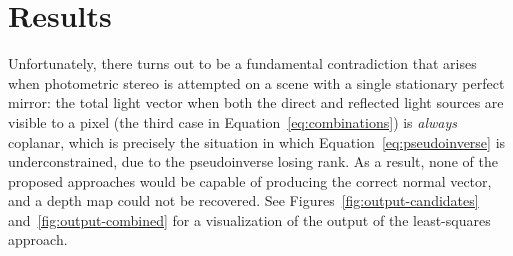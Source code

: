 \section{Results}\label{sec:results}
Unfortunately, there turns out to be a fundamental contradiction that arises
when photometric stereo is attempted on a scene with a single stationary
perfect mirror: the total light vector when both the direct and reflected light
sources are visible to a pixel (the third case in
Equation~\ref{eq:combinations}) is \emph{always} coplanar, which is precisely
the situation in which Equation~\ref{eq:pseudoinverse} is underconstrained, due
to the pseudoinverse losing rank. As a result, none of the proposed approaches
would be capable of producing the correct normal vector, and a depth map could
not be recovered. See Figures~\ref{fig:output-candidates}
and~\ref{fig:output-combined} for a visualization of the output
of the least-squares approach.

